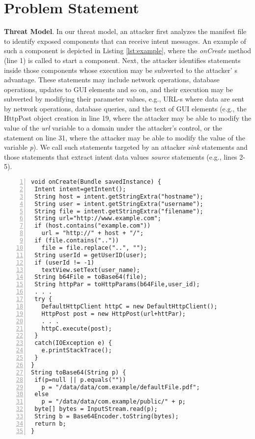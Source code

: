 \section{Problem Statement}
\label{sec:problem}

\textbf{Threat Model}. In our threat model, an attacker first analyzes the manifest file to identify exposed components that can receive intent messages. An example of such a component is depicted in Listing \ref{lst:example}, where the \textit{onCreate} method (line 1) is called to start a component. Next, the attacker identifies statements inside those components whose execution may be subverted to the attacker' s advantage. These statements may include network operations, database operations, updates to GUI elements and so on, and their execution may be subverted by modifying their parameter values, e.g., URL-s where data are sent by network operations, database queries, and the text of GUI elements (e.g., the HttpPost object creation in line 19, where the attacker may be able to modify the value of the \textit{url} variable to a domain under the attacker's control, or the statement on line 31, where the attacker may be able to modify the value of the variable \textit{p}). We call such statements targeted by an attacker \textit{sink} statements and those statements that extract intent data values \textit{source} statements (e.g., lines 2-5). 

\begin{lstlisting}[caption={Source code of a vulnerable application},label={lst:example},numbers=left,basicstyle=\ttfamily\scriptsize ]
void onCreate(Bundle savedInstance) {
 Intent intent=getIntent();
 String host = intent.getStringExtra("hostname");
 String user = intent.getStringExtra("username");
 String file = intent.getStringExtra("filename");
 String url="http://www.example.com";
 if (host.contains("example.com"))
   url = "http://" + host + "/";
 if (file.contains(".."))
   file = file.replace("..", "");
 String userId = getUserID(user);
 if (userId != -1)
   textView.setText(user_name);
 String b64File = toBase64(file);
 String httpPar = toHttpParams(b64File,user_id);
 . . .
 try {
   DefaultHttpClient httpC = new DefaultHttpClient();
   HttpPost post = new HttpPost(url+httPar);
   . . .
   httpC.execute(post);
 }
 catch(IOException e) {
   e.printStackTrace();
 }
}
String toBase64(String p) {
 if(p=null || p.equals(""))
   p = "/data/data/com.example/defaultFile.pdf";
 else
   p = "/data/data/com.example/public/" + p;
 byte[] bytes = InputStream.read(p);
 String b = Base64Encoder.toString(bytes);
 return b;
}
\end{lstlisting}

